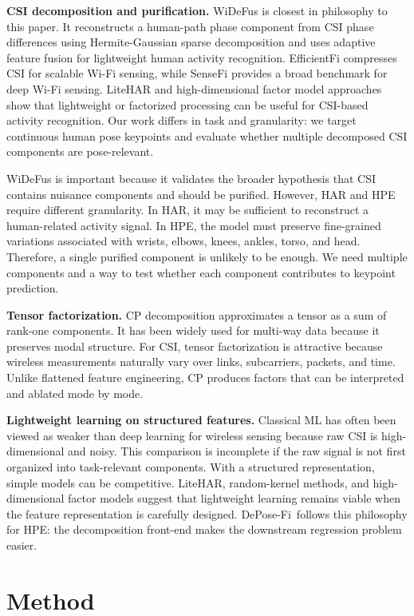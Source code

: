 \documentclass[letterpaper]{article}
\newcommand{\method}{DePose-Fi}
\begin{document}
\textbf{CSI decomposition and purification.}
WiDeFus is closest in philosophy to this paper. It reconstructs a human-path phase component from CSI phase differences using Hermite-Gaussian sparse decomposition and uses adaptive feature fusion for lightweight human activity recognition. EfficientFi compresses CSI for scalable Wi-Fi sensing, while SenseFi provides a broad benchmark for deep Wi-Fi sensing. LiteHAR and high-dimensional factor model approaches show that lightweight or factorized processing can be useful for CSI-based activity recognition. Our work differs in task and granularity: we target continuous human pose keypoints and evaluate whether multiple decomposed CSI components are pose-relevant.

WiDeFus is important because it validates the broader hypothesis that CSI contains nuisance components and should be purified. However, HAR and HPE require different granularity. In HAR, it may be sufficient to reconstruct a human-related activity signal. In HPE, the model must preserve fine-grained variations associated with wrists, elbows, knees, ankles, torso, and head. Therefore, a single purified component is unlikely to be enough. We need multiple components and a way to test whether each component contributes to keypoint prediction.

\textbf{Tensor factorization.}
CP decomposition approximates a tensor as a sum of rank-one components. It has been widely used for multi-way data because it preserves modal structure. For CSI, tensor factorization is attractive because wireless measurements naturally vary over links, subcarriers, packets, and time. Unlike flattened feature engineering, CP produces factors that can be interpreted and ablated mode by mode.

\textbf{Lightweight learning on structured features.}
Classical ML has often been viewed as weaker than deep learning for wireless sensing because raw CSI is high-dimensional and noisy. This comparison is incomplete if the raw signal is not first organized into task-relevant components. With a structured representation, simple models can be competitive. LiteHAR, random-kernel methods, and high-dimensional factor models suggest that lightweight learning remains viable when the feature representation is carefully designed. \method\ follows this philosophy for HPE: the decomposition front-end makes the downstream regression problem easier.

\section{Method}
\end{document}
